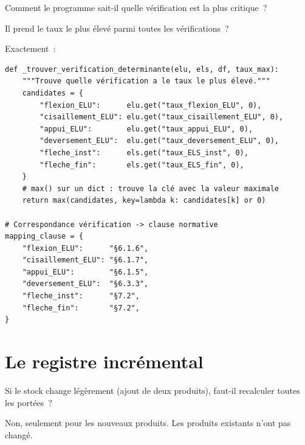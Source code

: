 \documentclass[12pt, a4paper, openany]{book}
\newcommand{\fichier}[1]{\texttt{\textit{#1}}}
\begin{document}
\begin{maitre}
Comment le programme sait-il quelle v\'erification est la plus critique~?
\end{maitre}

\begin{apprenti}
Il prend le taux le plus \'elev\'e parmi toutes les v\'erifications~?
\end{apprenti}

\begin{maitre}
Exactement~:
\end{maitre}

\begin{lstlisting}[style=python, caption={Extrait de \fichier{moteur.py} --- vérification déterminante}]
def _trouver_verification_determinante(elu, els, df, taux_max):
    """Trouve quelle vérification a le taux le plus élevé."""
    candidates = {
        "flexion_ELU":      elu.get("taux_flexion_ELU", 0),
        "cisaillement_ELU": elu.get("taux_cisaillement_ELU", 0),
        "appui_ELU":        elu.get("taux_appui_ELU", 0),
        "deversement_ELU":  elu.get("taux_deversement_ELU", 0),
        "fleche_inst":      els.get("taux_ELS_inst", 0),
        "fleche_fin":       els.get("taux_ELS_fin", 0),
    }
    # max() sur un dict : trouve la clé avec la valeur maximale
    return max(candidates, key=lambda k: candidates[k] or 0)

# Correspondance vérification -> clause normative
mapping_clause = {
    "flexion_ELU":      "§6.1.6",
    "cisaillement_ELU": "§6.1.7",
    "appui_ELU":        "§6.1.5",
    "deversement_ELU":  "§6.3.3",
    "fleche_inst":      "§7.2",
    "fleche_fin":       "§7.2",
}
\end{lstlisting}

\section{Le registre incr\'emental}

\begin{maitre}
Si le stock change l\'eg\`erement (ajout de deux produits),
faut-il recalculer toutes les port\'ees~?
\end{maitre}

\begin{apprenti}
Non, seulement pour les nouveaux produits.
Les produits existants n'ont pas chang\'e.
\end{apprenti}
\end{document}
